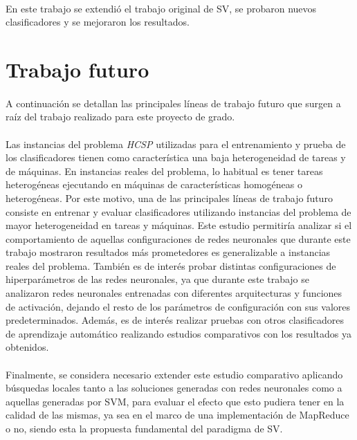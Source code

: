 \paragraph{}En este trabajo se extendió el trabajo original de SV, se probaron nuevos clasificadores y se mejoraron los resultados.

\section{Trabajo futuro}

\paragraph{}A continuación se detallan las principales líneas de trabajo futuro que surgen a raíz del trabajo realizado para este proyecto de grado.

\paragraph{}Las instancias del problema \textit{HCSP} utilizadas para el entrenamiento y prueba de los clasificadores tienen como característica una baja heterogeneidad de tareas y de máquinas. En instancias reales del problema, lo habitual es tener tareas heterogéneas ejecutando en máquinas de características homogéneas o heterogéneas.
Por este motivo, una de las principales líneas de trabajo futuro consiste en entrenar y evaluar clasificadores utilizando instancias del problema de mayor heterogeneidad en tareas y máquinas.
Este estudio permitiría analizar si el comportamiento de aquellas configuraciones de redes neuronales que durante este trabajo mostraron resultados más prometedores es generalizable a instancias reales del problema.
También es de interés probar distintas configuraciones de hiperparámetros de las redes neuronales, ya que durante este trabajo se analizaron redes neuronales entrenadas con diferentes arquitecturas y funciones de activación, dejando el resto de los parámetros de configuración con sus valores predeterminados. Además, es de interés realizar pruebas con otros clasificadores de aprendizaje automático realizando estudios comparativos con los resultados ya obtenidos.

\paragraph{}Finalmente, se considera necesario extender este estudio comparativo aplicando búsquedas locales tanto a las soluciones generadas con redes neuronales como a aquellas generadas por SVM, para evaluar el efecto que esto pudiera tener en la calidad de las mismas, ya sea en el marco de una implementación de MapReduce o no, siendo esta la propuesta fundamental del paradigma de SV.

